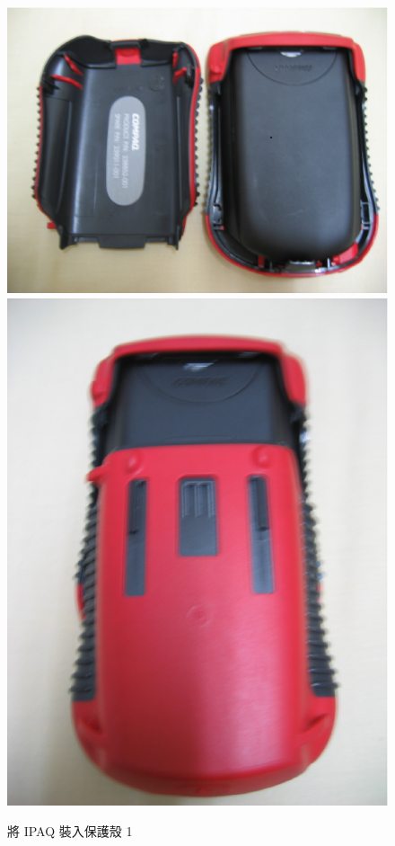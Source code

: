 \documentclass[12pt,a4paper]{article}
\begin{document}
\begin{CJK}{UTF8}{bsmi}
\begin{figure}[htbp]
\centering
\includegraphics[scale=0.3]{eps/shell_3.eps}%
\hspace{0.5cm}%
\includegraphics[scale=0.3]{eps/shell_4.eps}
\caption{將 IPAQ 裝入保護殼 1}
\end{figure}



\end{CJK}
\end{document}
